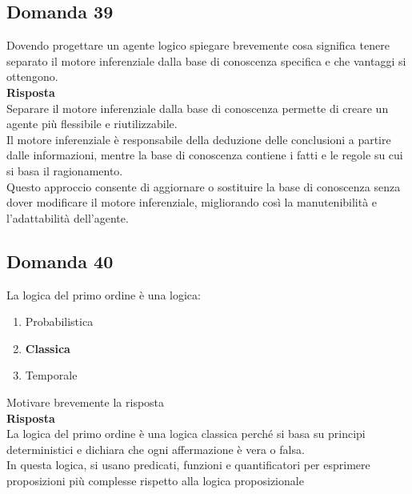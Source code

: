 \documentclass[../main.tex]{subfiles}
\begin{document}
	\subsection{Domanda 39}
	Dovendo progettare un agente logico spiegare brevemente cosa significa tenere separato il motore inferenziale dalla base di conoscenza specifica e che vantaggi si ottengono.\\
	\textbf{Risposta}\\
	Separare il motore inferenziale dalla base di conoscenza permette di creare un agente più flessibile e riutilizzabile.\\
	Il motore inferenziale è responsabile della deduzione delle conclusioni a partire dalle informazioni, mentre la base di conoscenza contiene i fatti e le regole su cui si basa il ragionamento. \\
	Questo approccio consente di aggiornare o sostituire la base di conoscenza senza dover modificare il motore inferenziale, migliorando così la manutenibilità e l'adattabilità dell'agente.
	\subsection{Domanda 40}
	La logica del primo ordine è una logica:
	\begin{enumerate}
		\item Probabilistica 
		\item \textbf{Classica} 
		\item Temporale 
	\end{enumerate}
	Motivare brevemente la risposta\\
	\textbf{Risposta}\\
	La logica del primo ordine è una logica classica perché si basa su principi deterministici e dichiara che ogni affermazione è vera o falsa. \\
	In questa logica, si usano predicati, funzioni e quantificatori per esprimere proposizioni più complesse rispetto alla logica proposizionale
\end{document}
